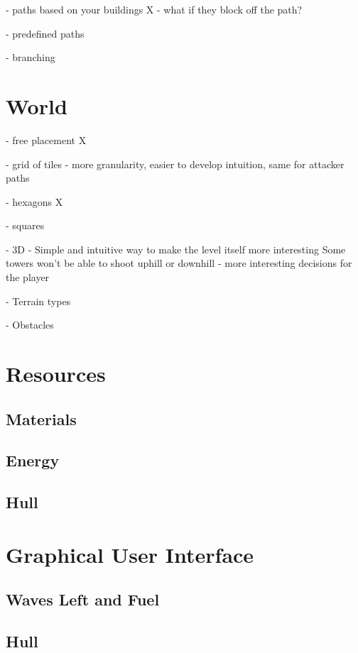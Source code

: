 - paths based on your buildings X
- what if they block off the path?

- predefined paths \checkmark

- branching

\section{World}

- free placement X

- grid of tiles \checkmark
- more granularity, easier to develop intuition, same for attacker paths

- hexagons X

- squares \checkmark

- 3D \checkmark
- Simple and intuitive way to make the level itself more interesting
Some towers won't be able to shoot uphill or downhill - more interesting decisions for the player

- Terrain types

- Obstacles

\section{Resources}

\subsection{Materials}

\subsection{Energy}

\subsection{Hull}

\section{Graphical User Interface}


\subsection{Waves Left and Fuel}

\subsection{Hull}

